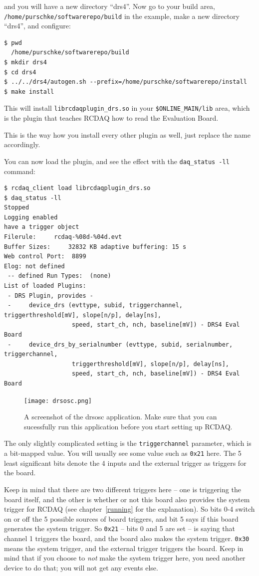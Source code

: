 \documentclass{article}[11pt]
\begin{document}
and you will have a new directory ``drs4''. Now go to your build area,
\verb|/home/purschke/softwarerepo/build| in the example, make a new directory ``drs4'',
and configure:

\begin{verbatim} 
$ pwd 
  /home/purschke/softwarerepo/build 
$ mkdir drs4 
$ cd drs4 
$ ../../drs4/autogen.sh --prefix=/home/purschke/softwarerepo/install 
$ make install
\end{verbatim}

This will install \verb|librcdaqplugin_drs.so| in your
\verb|$ONLINE_MAIN/lib| area, which is the plugin that teaches RCDAQ how
to read the Evaluation Board.

This is the way how you install every other plugin as well, just
replace the name accordingly.

You can now load the plugin, and see the effect with the
\verb|daq_status -ll| command:

{\footnotesize 
\begin{verbatim}
$ rcdaq_client load librcdaqplugin_drs.so
$ daq_status -ll
Stopped
Logging enabled
have a trigger object
Filerule:     rcdaq-%08d-%04d.evt
Buffer Sizes:     32832 KB adaptive buffering: 15 s
Web control Port:  8899
Elog: not defined
 -- defined Run Types:  (none)
List of loaded Plugins:
 - DRS Plugin, provides -
 -     device_drs (evttype, subid, triggerchannel, triggerthreshold[mV], slope[n/p], delay[ns], 
                   speed, start_ch, nch, baseline[mV]) - DRS4 Eval Board
 -     device_drs_by_serialnumber (evttype, subid, serialnumber, triggerchannel, 
                   triggerthreshold[mV], slope[n/p], delay[ns], 
                   speed, start_ch, nch, baseline[mV]) - DRS4 Eval Board
\end{verbatim}
}

\begin{figure}
  \centering
  \texttt{[image: drsosc.png]}
  \caption{\label{drsosc}A screenshot of the drsosc application. Make
    sure that you can sucessfully run this application before you
    start setting up RCDAQ.}
\end{figure}

The only slightly complicated setting is the \verb|triggerchannel|
parameter, which is a bit-mapped value. You will usually see some
value such as \verb|0x21| here. The 5 least significant bits denote
the 4 inputs and the external trigger as triggers for the board.

Keep in mind that there are two different triggers here -- one is
triggering the board itself, and the other is whether or not this
board also provides the system trigger for RCDAQ (see
chapter~\ref{running} for the explanation). So bits 0-4 switch on or
off the 5 possible sources of board triggers, and bit 5 says if this
board generates the system trigger. So \verb|0x21| -- bits 0 and 5 are
set -- is saying that channel 1 triggers the board, and the board also
makes the system trigger. \verb|0x30| means the system trigger, and
the external trigger triggers the board. Keep in mind that if you
choose to \emph{not} make the system trigger here, you need another
device to do that; you will not get any events else.
\end{document}
